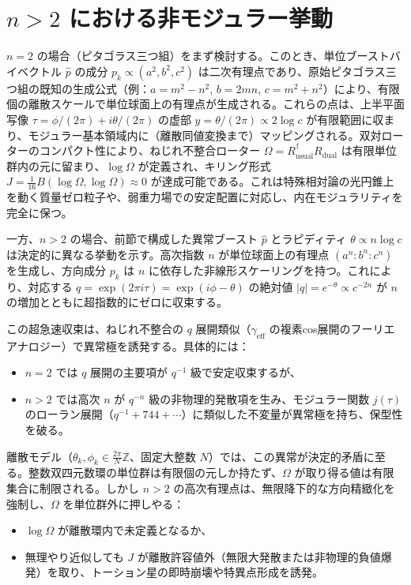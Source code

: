 \documentclass[dvipdfmx,a4paper]{article}
\begin{document}
\section{$n > 2$ における非モジュラー挙動}

$n=2$ の場合（ピタゴラス三つ組）をまず検討する。このとき、単位ブーストバイベクトル $\hat{p}$ の成分 $p_k \propto (a^2, b^2, c^2)$ は二次有理点であり、原始ピタゴラス三つ組の既知の生成公式（例：$a = m^2 - n^2$, $b = 2mn$, $c = m^2 + n^2$）により、有限個の離散スケールで単位球面上の有理点が生成される。これらの点は、上半平面写像 $\tau = \phi/(2\pi) + i \theta/(2\pi)$ の虚部 $y = \theta/(2\pi) \propto 2 \log c$ が有限範囲に収まり、モジュラー基本領域内に（離散同値変換まで）マッピングされる。双対ローターのコンパクト性により、ねじれ不整合ローター $\Omega = R_\text{usual}^\dagger R_\text{dual}$ は有限単位群内の元に留まり、$\log \Omega$ が定義され、キリング形式 $J = \frac{1}{16} B(\log \Omega, \log \Omega) \approx 0$ が達成可能である。これは特殊相対論の光円錐上を動く質量ゼロ粒子や、弱重力場での安定配置に対応し、内在モジュラリティを完全に保つ。

一方、$n > 2$ の場合、前節で構成した異常ブースト $\hat{p}$ とラピディティ $\theta \propto n \log c$ は決定的に異なる挙動を示す。高次指数 $n$ が単位球面上の有理点 $(a^n : b^n : c^n)$ を生成し、方向成分 $p_k$ は $n$ に依存した非線形スケーリングを持つ。これにより、対応する $q = \exp(2\pi i \tau) = \exp(i \phi - \theta)$ の絶対値 $|q| = e^{-\theta} \propto c^{-2n}$ が $n$ の増加とともに超指数的にゼロに収束する。

この超急速収束は、ねじれ不整合の $q$ 展開類似（$\gamma_\text{eff}$ の複素cos展開のフーリエアナロジー）で異常極を誘発する。具体的には：
\begin{itemize}
  \item $n=2$ では $q$ 展開の主要項が $q^{-1}$ 級で安定収束するが、
  \item $n > 2$ では高次 $n$ が $q^{-n}$ 級の非物理的発散項を生み、モジュラー関数 $j(\tau)$ のローラン展開（$q^{-1} + 744 + \cdots$）に類似した不変量が異常極を持ち、保型性を破る。
\end{itemize}

離散モデル（$\theta_k, \phi_k \in \frac{2\pi}{N} \mathbb{Z}$、固定大整数 $N$）では、この異常が決定的矛盾に至る。整数双四元数環の単位群は有限個の元しか持たず、$\Omega$ が取り得る値は有限集合に制限される。しかし $n > 2$ の高次有理点は、無限降下的な方向精緻化を強制し、$\Omega$ を単位群外に押しやる：
\begin{itemize}
  \item $\log \Omega$ が離散環内で未定義となるか、
  \item 無理やり近似しても $J$ が離散許容値外（無限大発散または非物理的負値爆発）を取り、トーション星の即時崩壊や特異点形成を誘発。
\end{itemize}
\end{document}
